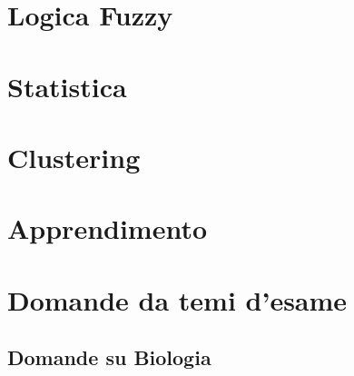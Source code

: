 \providecommand{\main}{.}





{\hypersetup{hidelinks}
	\tableofcontents  %
}

\chapter{Logica Fuzzy}


\chapter{Statistica}


\chapter{Clustering}


\chapter{Apprendimento}


\appendix
\chapter{Domande da temi d'esame}


\clearpage

\clearpage

\clearpage

\clearpage

\clearpage

\clearpage


\section{Domande su Biologia}




